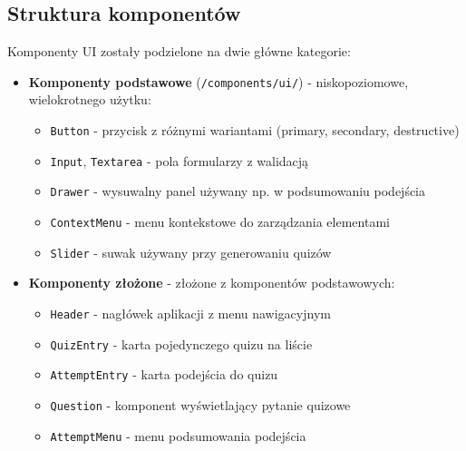 \documentclass{article}
\begin{document}
      \subsection{Struktura komponentów}
        Komponenty UI zostały podzielone na dwie główne kategorie:
        \begin{itemize}
          \item \textbf{Komponenty podstawowe} (\texttt{/components/ui/}) - niskopoziomowe, wielokrotnego użytku:
            \begin{itemize}
              \item \texttt{Button} - przycisk z różnymi wariantami (primary, secondary, destructive)
              \item \texttt{Input}, \texttt{Textarea} - pola formularzy z walidacją
              \item \texttt{Drawer} - wysuwalny panel używany np. w podsumowaniu podejścia
              \item \texttt{ContextMenu} - menu kontekstowe do zarządzania elementami
              \item \texttt{Slider} - suwak używany przy generowaniu quizów
            \end{itemize}
          \item \textbf{Komponenty złożone} - złożone z komponentów podstawowych:
            \begin{itemize}
              \item \texttt{Header} - nagłówek aplikacji z menu nawigacyjnym
              \item \texttt{QuizEntry} - karta pojedynczego quizu na liście
              \item \texttt{AttemptEntry} - karta podejścia do quizu
              \item \texttt{Question} - komponent wyświetlający pytanie quizowe
              \item \texttt{AttemptMenu} - menu podsumowania podejścia
            \end{itemize}
        \end{itemize}
    
\end{document}
